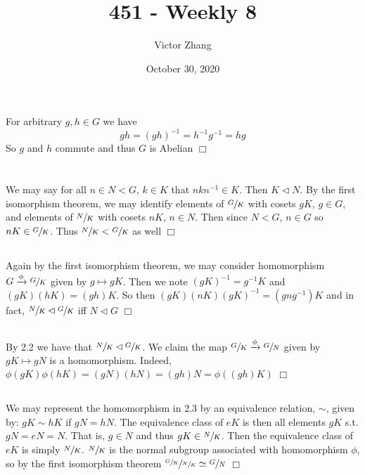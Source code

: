 \documentclass{article}
\title{451 - Weekly 8}
\author{Victor Zhang}
\date{October 30, 2020}
\begin{document}
\maketitle

\section{}
For arbitrary $g,h \in G$ we have
$$gh = (gh)^{-1} = h^{-1}g^{-1} = hg$$
So $g$ and $h$ commute and thus $G$ is Abelian $\Box$

\section{}
\subsection{}
We may say for all $n \in N < G$, $k \in K$ that $nkn^{-1} \in K$. Then $K \lhd N$. By the first isomorphism theorem, we may identify elements of $\sfrac{G}{K}$ with cosets $gK$, $g \in G$, and elements of $\sfrac{N}{K}$ with cosets $nK$, $n \in N$. Then since $N < G$, $n \in G$ so $nK \in \sfrac{G}{K}$. Thus $\sfrac{N}{K} < \sfrac{G}{K}$ as well $\Box$

\subsection{}
Again by the first isomorphism theorem, we may consider homomorphism $G \xrightarrow{\phi} \sfrac{G}{K}$ given by $g \mapsto gK$. Then we note $(gK)^{-1} = g^{-1}K$ and $(gK)(hK) = (gh)K$. So then $(gK)(nK)(gK)^{-1} = (gng^{-1})K$ and in fact, $\sfrac{N}{K} \lhd \sfrac{G}{K}$ iff $N \lhd G$ $\Box$

\subsection{}
By 2.2 we have that $\sfrac{N}{K} \lhd \sfrac{G}{K}$. We claim the map $\sfrac{G}{K} \xrightarrow{\phi} \sfrac{G}{N}$ given by $gK \mapsto gN$ is a homomorphism. Indeed, $\phi(gK)\phi(hK) = (gN)(hN) = (gh)N = \phi((gh)K)$ $\Box$

\subsection{}
We may represent the homomorphism in 2.3 by an equivalence relation, $\sim$, given by: $gK \sim hK$ if $gN = hN$. The equivalence class of $eK$ is then all elements $gK$ s.t. $gN = eN = N$. That is, $g \in N$ and thus $gK \in \sfrac{N}{K}$. Then the equivalence class of $eK$ is simply $\sfrac{N}{K}$. $\sfrac{N}{K}$ is the normal subgroup associated with homomorphism $\phi$, so by the first isomorphism theorem $\sfrac{\sfrac{G}{K}}{\sfrac{N}{K}} \simeq \sfrac{G}{N}$ $\Box$
\end{document}
